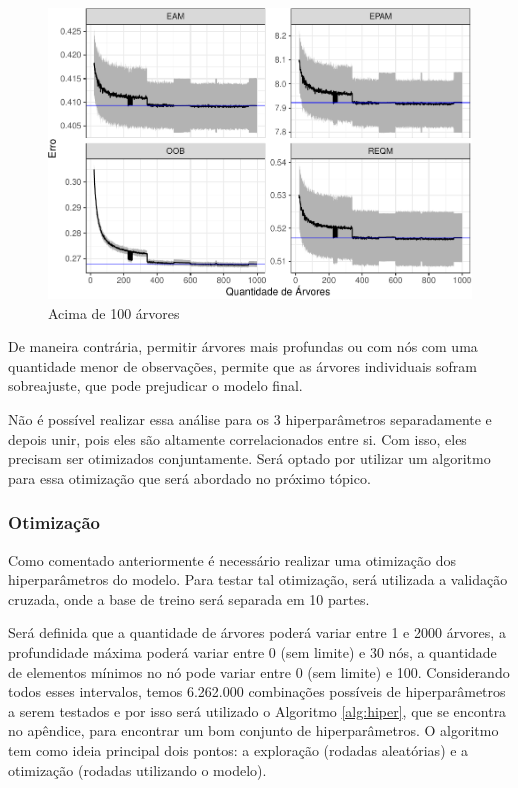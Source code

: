 \documentclass[
	12pt,				%
	a4paper,		%
	oneside,    %
	chapter=TITLE,		   %
	section=TITLE,		   %
	subsection=TITLE,	   %
	subsubsection=TITLE, %
	english,			%
	french,				%
	spanish,			%
	brazil,				%
]{abntex2}
\begin{document}
\begin{figure}
\centering
\includegraphics{00-TCC_files/figure-latex/qtd_arvores_zoom-1.pdf}
\caption{\label{qtd_arvores_zoom}Acima de 100 árvores}
\end{figure}

De maneira contrária, permitir árvores mais profundas ou com nós com uma
quantidade menor de observações, permite que as árvores individuais
sofram sobreajuste, que pode prejudicar o modelo final.

Não é possível realizar essa análise para os 3 hiperparâmetros
separadamente e depois unir, pois eles são altamente correlacionados
entre si. Com isso, eles precisam ser otimizados conjuntamente. Será
optado por utilizar um algoritmo para essa otimização que será abordado
no próximo tópico.

\hypertarget{otimizauxe7uxe3o}{%
\subsubsection{Otimização}\label{otimizauxe7uxe3o}}

Como comentado anteriormente é necessário realizar uma otimização dos
hiperparâmetros do modelo. Para testar tal otimização, será utilizada a
validação cruzada, onde a base de treino será separada em 10 partes.

Será definida que a quantidade de árvores poderá variar entre 1 e 2000
árvores, a profundidade máxima poderá variar entre 0 (sem limite) e 30
nós, a quantidade de elementos mínimos no nó pode variar entre 0 (sem
limite) e 100. Considerando todos esses intervalos, temos 6.262.000
combinações possíveis de hiperparâmetros a serem testados e por isso
será utilizado o Algoritmo \ref{alg:hiper}, que se encontra no apêndice,
para encontrar um bom conjunto de hiperparâmetros. O algoritmo tem como
ideia principal dois pontos: a exploração (rodadas aleatórias) e a
otimização (rodadas utilizando o modelo).
\end{document}
